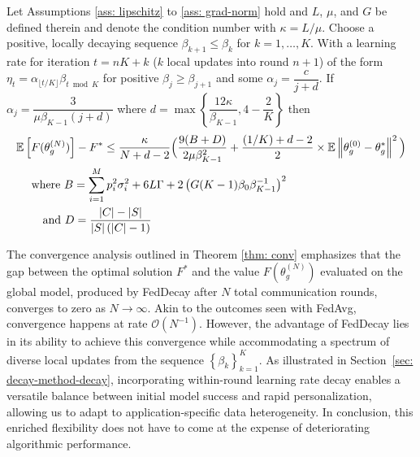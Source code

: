 \begin{theorem}
\label{thm: conv}
    Let Assumptions \ref{ass: lipschitz} to \ref{ass: grad-norm} hold and $L$, $\mu$, and $G$ be defined therein and denote the condition number with $\kappa = L / \mu$.
    Choose a positive, locally decaying sequence $\beta_{k + 1} \leq \beta_k$ for $k = 1, \ldots, K$. 
    With a learning rate for iteration $t = nK + k$ ($k$ local updates into round $n + 1$) of the form $\eta_t = \alpha_{\lfloor t/K \rfloor} \beta_{t \bmod K}$ for positive $\beta_j \geq \beta_{j + 1}$ and some $\alpha_j = \dfrac{c}{j + d}$.
    If $\alpha_j = \dfrac{3}{\mu \beta_{K - 1} (j + d)}$ where $d = \max \left\{ \dfrac{12 \kappa}{\beta_{K - 1}}, 4 - \dfrac{2}{K} \right\}$ then 
    \begin{align}
        & \mathbb{E} \left[ F ( \theta_g^{(N)} ) \right] - F^* \leq \dfrac{\kappa}{N + d - 2} \Big( \dfrac{9(B + D)}{2 \mu \beta_{K - 1}^{2}} + \dfrac{(1/K) + d - 2}{2} \times \mathbb{E} \left\lVert\theta_g^{(0)} - \theta_g^*\right\rVert^2 \Big) \\
        & \quad \textrm{ where } B = \sum_{i = 1}^M p_i^2 \sigma_i^2 + 6 L \Gamma + 2 \left( G (K - 1) \beta_0 \beta_{K - 1}^{-1} \right)^2 \\
        & \qquad \textrm{ and } D = \dfrac{\left\lvert C\right\rvert - \left\lvert S\right\rvert}{\left\lvert S\right\rvert(\left\lvert C\right\rvert - 1)}
    \end{align}
\end{theorem}

The convergence analysis outlined in Theorem \ref{thm: conv} emphasizes that the gap between the optimal solution $F^*$ and the value $F(\theta_g^{(N)})$ evaluated on the global model, produced by FedDecay after $N$ total communication rounds, converges to zero as $N \rightarrow \infty$. 
Akin to the outcomes seen with FedAvg, convergence happens at rate $\mathcal{O}(N^{-1})$.
However, the advantage of FedDecay lies in its ability to achieve this convergence while accommodating a spectrum of diverse local updates from the sequence $\left\{ \beta_k \right\}_{k = 1}^K$. 
As illustrated in Section~\ref{sec: decay-method-decay}, incorporating within-round learning rate decay enables a versatile balance between initial model success and rapid personalization, allowing us to adapt to application-specific data heterogeneity. 
In conclusion, this enriched flexibility does not have to come at the expense of deteriorating algorithmic performance.
